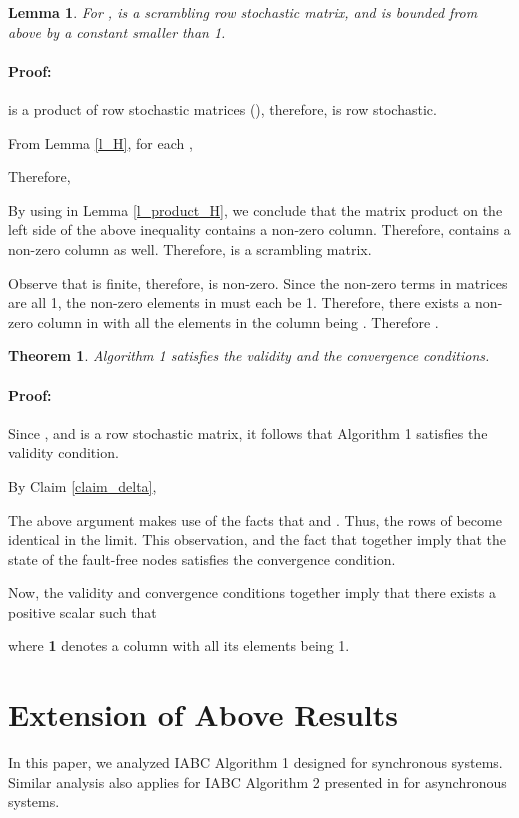 \documentclass[letterpaper, 12pt]{article}
\newenvironment{proof}{\paragraph{\bf Proof:}}{\hspace*{\fill}}
\newtheorem{theorem}{Theorem}
\newtheorem{lemma}{Lemma}
\begin{document}
\begin{lemma}
\label{l_Q}
For ,  is a scrambling row stochastic matrix,
and  is bounded from above by a constant
smaller than 1.
\end{lemma}
\begin{proof}


 is a product of row stochastic matrices (), therefore,
 is row stochastic.

From Lemma \ref{l_H}, for each ,

Therefore, 

By using  in Lemma \ref{l_product_H},
we conclude that the matrix product on the left side
of the above inequality contains a non-zero column. Therefore,  contains
a non-zero column as well. Therefore,  is a scrambling matrix.

Observe that  is finite, therefore, 
is non-zero. Since the non-zero terms in  matrices are all 1,
the non-zero elements in 
must each be  1. Therefore, there exists a non-zero column in 
with all the elements in the column being .
Therefore .
\end{proof}

\begin{theorem}
\label{t}
Algorithm 1 satisfies the validity and the convergence conditions.
\end{theorem}
\begin{proof}

Since , and  is a row stochastic matrix, it
follows that
Algorithm 1 satisfies the validity condition.

By Claim \ref{claim_delta}, 

The above argument makes use of the facts that
 and .
Thus, the rows of  become identical in the limit.
This observation, and the fact that  together imply that
the state of the fault-free nodes satisfies the
convergence condition.


Now, the validity and convergence conditions
together imply that 
there exists a positive scalar  such that
 
where {\bf 1} denotes a column with all its elements being 1.

\end{proof}

\section{Extension of Above Results}
\label{s_extend}

In this paper, we
analyzed IABC Algorithm 1 designed for synchronous systems. Similar
analysis also applies for IABC Algorithm 2 presented
in \cite{us} for asynchronous systems. 
\end{document}
